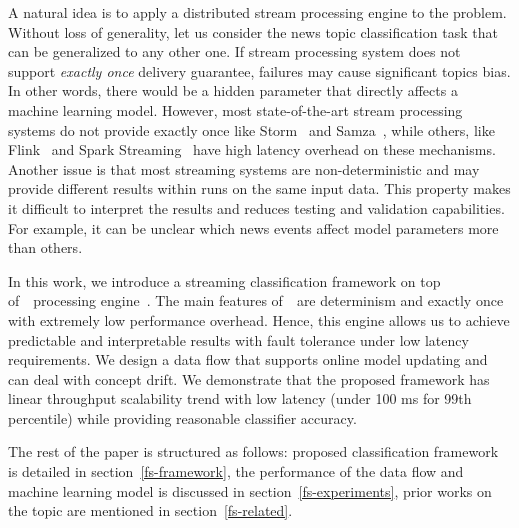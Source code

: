 A natural idea is to apply a distributed stream processing engine to the problem. Without loss of generality, let us consider the news topic classification task that can be generalized to any other one. If stream processing system does not support {\em exactly once} delivery guarantee, failures may cause significant topics bias. In other words, there would be a hidden parameter that directly affects a machine learning model. However, most state-of-the-art stream processing systems do not provide exactly once like Storm~\cite{apache:storm} and Samza~\cite{Noghabi:2017:SSS:3137765.3137770}, while others, like Flink~\cite{Carbone:2017:SMA:3137765.3137777} and Spark Streaming~\cite{Zaharia:2012:DSE:2342763.2342773} have high latency overhead on these mechanisms. Another issue is that most streaming systems are non-deterministic and may provide different results within runs on the same input data. This property makes it difficult to interpret the results and reduces testing and validation capabilities. For example, it can be unclear which news events affect model parameters more than others. 

In this work, we introduce a streaming classification framework on top of~\FlameStream\ processing engine~\cite{we2018beyondmr, we2018adbis}. The main features of~\FlameStream\ are determinism and exactly once with extremely low performance overhead. Hence, this engine allows us to achieve predictable and interpretable results with fault tolerance under low latency requirements. We design a data flow that supports online model updating and can deal with concept drift. We demonstrate that the proposed framework has linear throughput scalability trend with low latency (under 100 ms for 99th percentile) while providing reasonable classifier accuracy.

The rest of the paper is structured as follows: proposed classification framework is detailed in section~\ref{fs-framework}, the performance of the data flow and machine learning model is discussed in section~\ref{fs-experiments}, prior works on the topic are mentioned in section~\ref{fs-related}.
